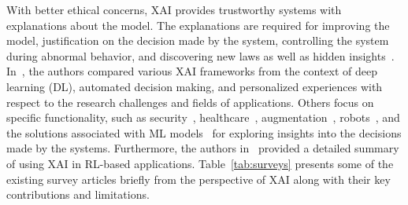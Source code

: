 \documentclass[journal]{IEEEtran}
\begin{document}
With better ethical concerns, XAI provides trustworthy systems with explanations about the model. The explanations are required for improving the model, justification on the decision made by the system, controlling the system during abnormal behavior, and discovering new laws as well as hidden insights~\cite{adadi2018peeking}. In~\cite{xu2019explainable,longo2020explainable,meske2021explainable}, the authors compared various XAI frameworks from the context of deep learning (DL), automated decision making, and personalized experiences with respect to the research challenges and fields of applications. Others focus on specific functionality, such as security~\cite{mathews2019explainable,islam2021explainable}, healthcare~\cite{payrovnaziri2020explainable,tjoa2020survey,jimenez2020drug}, augmentation~\cite{vassiliades2021argumentation}, robots~\cite{anjomshoae2019explainable,sado2020explainable}, and the solutions associated with ML models~\cite{emmert2020explainable,roscher2020explainable,linardatos2021explainable} for exploring insights into the decisions made by the systems. Furthermore, the authors in~\cite{puiutta2020explainable} provided a detailed summary of using XAI in RL-based applications. Table~\ref{tab:surveys} presents some of the existing survey articles briefly from the perspective of XAI along with their key contributions and limitations.
\end{document}
